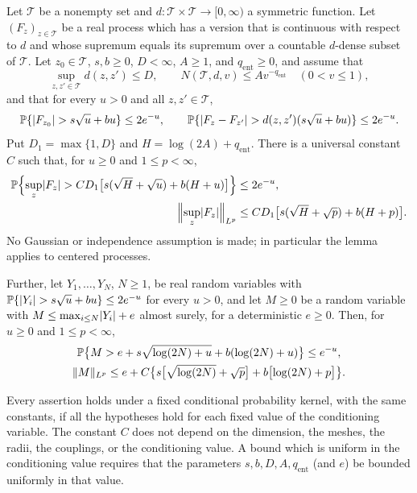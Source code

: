 \begin{lemma}\label{ch13:lem:coefficient-metric-chaining}
Let $\mathcal T$ be a nonempty set and $d:\mathcal T\times\mathcal T\to[0,\infty)$ a symmetric function. Let $(F_z)_{z\in\mathcal T}$ be a real process which has a version that is continuous with respect to $d$ and whose supremum equals its supremum over a countable $d$-dense subset of $\mathcal T$. Let $z_0\in\mathcal T$, $s,b\ge0$, $D<\infty$, $A\ge1$, and $q_{\mathrm{ent}}\ge0$, and assume that
\[
 \sup_{z,z'\in\mathcal T}d(z,z')\le D,\qquad N(\mathcal T,d,v)\le Av^{-q_{\mathrm{ent}}}\quad(0<v\le1),
\]
and that for every $u>0$ and all $z,z'\in\mathcal T$,
\[
 \mathbb P\{\lvert F_{z_0}\rvert>s\sqrt u+bu\}\le2e^{-u},\qquad
 \mathbb P\{\lvert F_z-F_{z'}\rvert>d(z,z')(s\sqrt u+bu)\}\le2e^{-u}.
\]
Put $D_1=\max\{1,D\}$ and $H=\log(2A)+q_{\mathrm{ent}}$. There is a universal constant $C$ such that, for $u\ge0$ and $1\le p<\infty$,
\[
 \begin{split}
 \mathbb P\Bigl\{\sup_z\lvert F_z\rvert>CD_1\bigl[s(\sqrt H+\sqrt u)+b(H+u)\bigr]\Bigr\}&\le2e^{-u},\\
 \Bigl\lVert\sup_z\lvert F_z\rvert\Bigr\rVert_{L^p}&\le CD_1\bigl[s(\sqrt H+\sqrt p)+b(H+p)\bigr].
 \end{split}
\]
No Gaussian or independence assumption is made; in particular the lemma applies to centered processes.

Further, let $Y_1,\dots,Y_N$, $N\ge1$, be real random variables with $\mathbb P\{\lvert Y_i\rvert>s\sqrt u+bu\}\le2e^{-u}$ for every $u>0$, and let $M\ge0$ be a random variable with $M\le\max_{i\le N}\lvert Y_i\rvert+e$ almost surely, for a deterministic $e\ge0$. Then, for $u\ge0$ and $1\le p<\infty$,
\[
 \begin{gathered}
 \mathbb P\bigl\{M>e+s\sqrt{\log(2N)+u}+b(\log(2N)+u)\bigr\}\le e^{-u},\\
 \lVert M\rVert_{L^p}\le e+C\bigl\{s\bigl[\sqrt{\log(2N)}+\sqrt p\bigr]+b\bigl[\log(2N)+p\bigr]\bigr\}.
 \end{gathered}
\]

Every assertion holds under a fixed conditional probability kernel, with the same constants, if all the hypotheses hold for each fixed value of the conditioning variable. The constant $C$ does not depend on the dimension, the meshes, the radii, the couplings, or the conditioning value. A bound which is uniform in the conditioning value requires that the parameters $s,b,D,A,q_{\mathrm{ent}}$ (and $e$) be bounded uniformly in that value.
\end{lemma}


